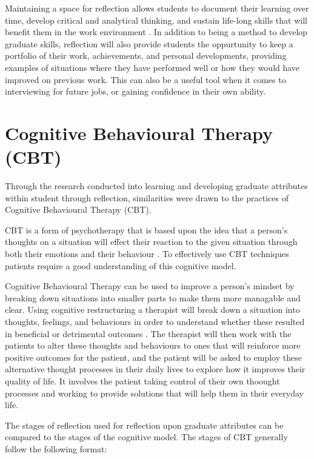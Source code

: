 \documentclass{l4proj}
\begin{document}
Maintaining a space for reflection allows students to document their learning over time, develop critical and analytical thinking, and sustain life-long skills that will benefit them in the work environment \citep{mcdermott_developing_nodate}.  In addition to being a method to develop graduate skills, reflection will also provide students the oppurtunity to keep a portfolio of their work, achievements, and personal developments, providing examples of situations where they have performed well or how they would have improved on previous work. This can also be a useful tool when it comes to interviewing for future jobs, or gaining confidence in their own ability. 


\section{Cognitive Behavioural Therapy (CBT)}

Through the research conducted into learning and developing graduate attributes within student through reflection, similarities were drawn to the practices of Cognitive Behavioural Therapy (CBT). 

CBT is a form of psychotherapy that is based upon the idea that a person's thoughts on a situation will effect their reaction to the given situation through both their emotions and their behaviour \citep{whatisCBT_therapistAid}. To effectively use CBT techniques patients require a good understanding of this cognitive model. 

Cognitive Behavioural Therapy can be used to improve a person's mindset by breaking down situations into smaller parts to make them more managable and clear. Using cognitive restructuring a therapist will break down a situation into thoughts, feelings, and behaviours in order to understand whether these resulted in beneficial or detrimental outcomes \citep{nhs_cognitive_2017}. The therapist will then work with the patients to alter these thoughts and behaviours to ones that will reinforce more positive outcomes for the patient, and the patient will be asked to employ these alternative thought processes in their daily lives to explore how it improves their quality of life. It involves the patient taking control of their own thoought processes and working to provide solutions that will help them in their everyday life.

The stages of reflection used for reflection upon graduate attributes can be compared to the stages of the cognitive model. The stages of CBT generally follow the following format:
\end{document}

